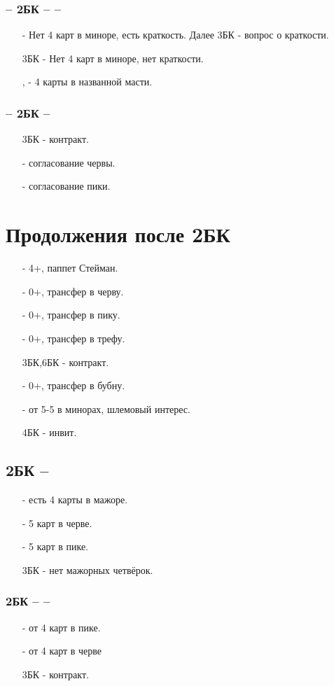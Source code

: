 \documentclass{article}
\begin{document}
\subsubsection{ -- 2БК --  -- }
\begin{enumerate}
    \item[\sp{3}] - Нет 4 карт в миноре, есть краткость. Далее 3БК - вопрос о краткости.
    \item[3БК] - Нет 4 карт в миноре, нет краткости.
    \item[\cl{4}, \di{4}] - 4 карты в названной масти.
\end{enumerate}
\subsubsection{ -- 2БК -- }
\begin{enumerate}
    \item[3БК] - контракт.
    \item[\cl{4}] - согласование червы.
    \item[\di{4}] - согласование пики.
\end{enumerate}
\section{Продолжения после 2БК}
\begin{enumerate}
    \item[\cl{3}] - 4+, паппет Стейман.
    \item[\di{3}] - 0+, трансфер в черву.
    \item[\he{3}] - 0+, трансфер в пику.
    \item[\sp{3}] - 0+, трансфер в трефу.
    \item[3БК,6БК] - контракт.
    \item[\cl{4}] - 0+, трансфер в бубну.
    \item[\sp{4}] - от 5-5 в минорах, шлемовый интерес.
    \item[4БК] - инвит.
\end{enumerate}
\subsection{2БК -- }
\begin{enumerate}
    \item[\di{3}] - есть 4 карты в мажоре.
    \item[\he{3}] - 5 карт в черве.
    \item[\sp{3}] - 5 карт в пике.
    \item[3БК] - нет мажорных четвёрок.
\end{enumerate}
\subsubsection{2БК --  -- }
\begin{enumerate}
    \item[\he{3}] - от 4 карт в пике.
    \item[\sp{3}] - от 4 карт в черве
    \item[3БК] - контракт.
\end{enumerate}
\end{document}
